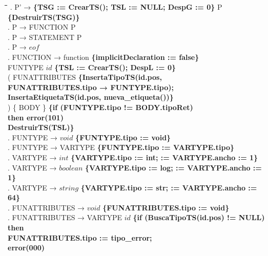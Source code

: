 \begin{tabbing}
    \hspace{1cm}\=\hspace{4.5cm}\=\hspace{2cm}\=\hspace{1cm}\=\hspace{1cm}\=\kill
    . P' → \textbf{\{TSG := CrearTS(); TSL := NULL; DespG := 0\}} P \textbf{\{DestruirTS(TSG)\}}\\
    . P → FUNCTION P\\
    . P → STATEMENT P\\
    . P → $eof$\\
    . FUNCTION → function \textbf{\{implicitDeclaration := false\}}\\
    \>              \> FUNTYPE $id$ \textbf{\{TSL := CrearTS(); DespL := 0\}} \\
    \>              \>( FUNATTRIBUTES \textbf{\{InsertaTipoTS(id.pos, }\\
    \>              \> \textbf{FUNATTRIBUTES.tipo → FUNTYPE.tipo);}\\
    \>           \>\textbf{InsertaEtiquetaTS(id.pos, nueva\_etiqueta())\}}\\
    \>              \>) \{ BODY \}\> \textbf{\{if (FUNTYPE.tipo != BODY.tipoRet)}\\
    \>              \>          \>             \>   \textbf{then error(101)}\\
    \>              \>          \> \textbf{DestruirTS(TSL)\}}\\
    . FUNTYPE → $void$ \textbf{\{FUNTYPE.tipo := void\}}\\
    . FUNTYPE → VARTYPE \textbf{\{FUNTYPE.tipo := VARTYPE.tipo\}}\\
    . VARTYPE → $int$ \textbf{\{VARTYPE.tipo := int; := VARTYPE.ancho := 1\}}\\
    . VARTYPE → $boolean$ \textbf{\{VARTYPE.tipo := log; := VARTYPE.ancho := 1\}}\\
    . VARTYPE → $string$ \textbf{\{VARTYPE.tipo := str; := VARTYPE.ancho := 64\}}\\
    . FUNATTRIBUTES → $void$ \textbf{\{FUNATTRIBUTES.tipo := void\}}\\
    . FUNATTRIBUTES → \>VARTYPE $id$ \textbf{\{if (BuscaTipoTS(id.pos) != NULL) then} \\
    \>              \>          \>    \>\textbf{FUNATTRIBUTES.tipo := tipo\_error;}\\
    \>              \>          \>    \>\textbf{error(000)}\\

\end{tabbing}
